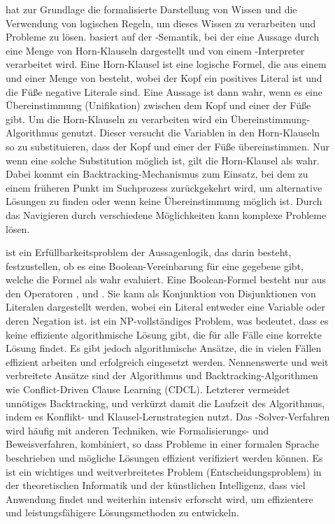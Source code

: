 \begin{description}
    \item[] hat zur Grundlage die formalisierte Darstellung von Wissen und die Verwendung von logischen Regeln, um dieses Wissen zu verarbeiten und Probleme zu lösen.
     basiert auf der -Semantik, bei der eine Aussage durch eine Menge von Horn-Klauseln dargestellt und von einem -Interpreter verarbeitet wird.
    Eine Horn-Klausel ist eine logische Formel, die aus einem  und einer Menge von  besteht, wobei der Kopf ein positives Literal ist und die Füße negative Literale sind.
    Eine Aussage ist dann wahr, wenn es eine Übereinstimmung (Unifikation) zwischen dem Kopf und einer der Füße gibt.
    Um die Horn-Klauseln zu verarbeiten wird ein Übereinstimmung-Algorithmus genutzt.
    Dieser versucht die Variablen in den Horn-Klauseln so zu substituieren, dass der Kopf und einer der Füße übereinstimmen.
    Nur wenn eine solche Substitution möglich ist, gilt die Horn-Klausel als wahr.
    Dabei kommt ein \sog Backtracking-Mechanismus zum Einsatz, bei dem zu einem früheren Punkt im Suchprozess zurückgekehrt wird, um alternative Lösungen zu finden oder wenn keine Übereinstimmung möglich ist.
    Durch das Navigieren durch verschiedene Möglichkeiten kann  komplexe Probleme lösen.

    \item[] ist ein Erfüllbarkeitsproblem der Aussagenlogik, das darin besteht, festzustellen, ob es eine Boolean-Vereinbarung für eine gegebene  gibt, welche die Formel als wahr evaluiert.
    Eine Boolean-Formel besteht nur aus den Operatoren ,  und .
    Sie kann als Konjunktion von Disjunktionen von Literalen dargestellt werden, wobei ein Literal entweder eine Variable oder deren Negation ist.
     ist ein NP-vollständiges Problem, was bedeutet, dass es keine effiziente algorithmische Lösung gibt, die für alle Fälle eine korrekte Lösung findet.
    Es gibt jedoch algorithmische Ansätze, die in vielen Fällen effizient arbeiten und erfolgreich eingesetzt werden.
    Nennenswerte und weit verbreitete Ansätze sind der  Algorithmus und Backtracking-Algorithmen wie Conflict-Driven Clause Learning (CDCL).
    Letzterer vermeidet unnötiges Backtracking, und verkürzt damit die Laufzeit des Algorithmus, indem es Konflikt- und Klausel-Lernstrategien nutzt.
    Das -Solver-Verfahren wird häufig mit anderen Techniken, wie \zB Formalisierungs- und Beweisverfahren, kombiniert, so dass Probleme in einer formalen Sprache beschrieben und mögliche Lösungen effizient verifiziert werden können.
    Es ist ein wichtiges und weitverbreitetes Problem (Entscheidungsproblem) in der theoretischen Informatik und der künstlichen Intelligenz, dass viel Anwendung findet und weiterhin intensiv erforscht wird, um effizientere und leistungsfähigere Lösungsmethoden zu entwickeln.


\end{description}
